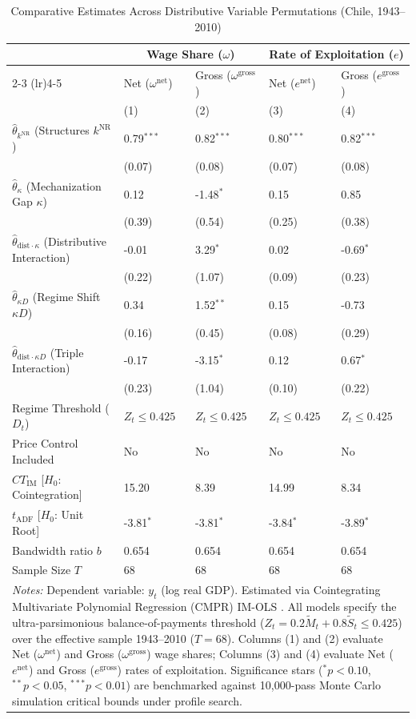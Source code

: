 \begin{table}[h!]
	\centering
	\caption{Comparative Estimates Across Distributive Variable Permutations (Chile, 1943--2010)}
	\label{tab:chile_distributive_comparison_main}
	\small
	\begin{tabular}{p{5.0cm}p{2.2cm}p{2.2cm}p{2.2cm}p{2.2cm}}
		\toprule
		& \multicolumn{2}{c}{Wage Share ($\omega$)} & \multicolumn{2}{c}{Rate of Exploitation ($e$)} \\
		\cmidrule(lr){2-3} \cmidrule(lr){4-5}
		& Net ($\omega^{\text{net}}$) & Gross ($\omega^{\text{gross}}$) & Net ($e^{\text{net}}$) & Gross ($e^{\text{gross}}$) \\
		& (1) & (2) & (3) & (4) \\
		\midrule
		$\hat{\theta}_{k^{\text{NR}}}$ (Structures $k^{\text{NR}}$) & 0.79$^{***}$ & 0.82$^{***}$ & 0.80$^{***}$ & 0.82$^{***}$ \\
		& (0.07) & (0.08) & (0.07) & (0.08) \\
		$\hat{\theta}_{\kappa}$ (Mechanization Gap $\kappa$) & 0.12 & -1.48$^{*}$ & 0.15 & 0.85 \\
		& (0.39) & (0.54) & (0.25) & (0.38) \\
		$\hat{\theta}_{\text{dist}\cdot\kappa}$ (Distributive Interaction) & -0.01 & 3.29$^{*}$ & 0.02 & -0.69$^{*}$ \\
		& (0.22) & (1.07) & (0.09) & (0.23) \\
		$\hat{\theta}_{\kappa D}$ (Regime Shift $\kappa D$) & 0.34 & 1.52$^{**}$ & 0.15 & -0.73 \\
		& (0.16) & (0.45) & (0.08) & (0.29) \\
		$\hat{\theta}_{\text{dist}\cdot\kappa D}$ (Triple Interaction) & -0.17 & -3.15$^{*}$ & 0.12 & 0.67$^{*}$ \\
		& (0.23) & (1.04) & (0.10) & (0.22) \\
		\midrule
		Regime Threshold ($D_t$) & $Z_t \le 0.425$ & $Z_t \le 0.425$ & $Z_t \le 0.425$ & $Z_t \le 0.425$ \\
		Price Control Included & No & No & No & No \\
		$CT_{\text{IM}}$ [$H_0$: Cointegration] & 15.20 & 8.39 & 14.99 & 8.34 \\
		$t_{\text{ADF}}$ [$H_0$: Unit Root] & -3.81$^{*}$ & -3.81$^{*}$ & -3.84$^{*}$ & -3.89$^{*}$ \\
		Bandwidth ratio $b$ & 0.654 & 0.654 & 0.654 & 0.654 \\
		Sample Size $T$ & 68 & 68 & 68 & 68 \\
		\bottomrule
		\multicolumn{5}{p{14.2cm}}{\footnotesize \textit{Notes:} Dependent variable: $y_t$ (log real GDP). Estimated via Cointegrating Multivariate Polynomial Regression (CMPR) IM-OLS \citep{VogelsangWagner2024}. All models specify the ultra-parsimonious balance-of-payments threshold ($Z_t = 0.2 \tilde{M}_t + 0.8 \tilde{S}_t \le 0.425$) over the effective sample 1943--2010 ($T=68$). Columns (1) and (2) evaluate Net ($\omega^{\text{net}}$) and Gross ($\omega^{\text{gross}}$) wage shares; Columns (3) and (4) evaluate Net ($e^{\text{net}}$) and Gross ($e^{\text{gross}}$) rates of exploitation. Significance stars ($^*p<0.10$, $^{**}p<0.05$, $^{***}p<0.01$) are benchmarked against 10,000-pass Monte Carlo simulation critical bounds under profile search.} \\

\end{tabular}
\end{table}
